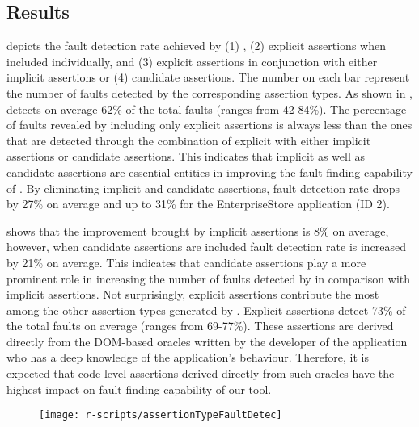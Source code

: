 \subsection{Results} \label{Sec:results}
  depicts the fault detection rate achieved by (1) \tool, (2) explicit assertions when included individually, and (3) explicit assertions in conjunction with either implicit assertions or (4) candidate assertions. The number on each bar represent the number of faults detected by the corresponding assertion types. As shown in , \tool detects on average 62\% of the total faults (ranges from 42-84\%).
The percentage of faults revealed by including only explicit assertions is always less than the ones that are detected through the combination of explicit with either implicit assertions or candidate assertions. This indicates that implicit as well as candidate assertions are essential entities in improving the fault finding capability of \tool. By eliminating implicit and candidate assertions, fault detection rate drops by 27\% on average and up to 31\% for the EnterpriseStore application (ID 2).

 shows that the improvement brought by implicit assertions is 8\% on average, however, when candidate assertions are included fault detection rate is increased by 21\% on average. This indicates that candidate assertions play a more prominent role in increasing the number of faults detected by \tool in comparison with implicit assertions. Not surprisingly, explicit assertions contribute the most among the other assertion types generated by \tool. Explicit assertions detect 73\% of the total faults on average (ranges from 69-77\%). These assertions are derived directly from the DOM-based oracles written by the developer of the application who has a deep knowledge of the application's behaviour. Therefore, it is expected that code-level assertions derived directly from such oracles have the highest impact on fault finding capability of our tool.        

\begin{figure}[!t]
  \centering
  \texttt{[image: r-scripts/assertionTypeFaultDetec]}
  \vspace{-0.18in} 
  \vspace{-0.1in} 
  \label{Fig:assertionTypeFaultDetec}
 
\end{figure}

